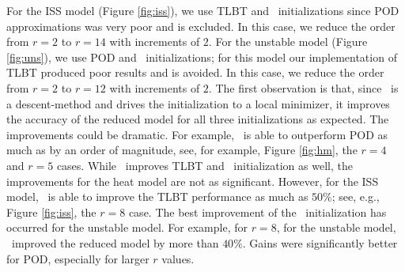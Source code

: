 \documentclass[twocolumn]{autart}
\begin{document}
  
  
   For the ISS model (Figure \ref{fig:iss}), we use  TLBT and \goyal \ initializations since  POD approximations was very poor and  is excluded. In this case, we reduce the order from $r=2$ to $r=14$ with increments of $2$. For the unstable model (Figure \ref{fig:uns}), we use POD and \goyal \ initializations; for this model our implementation of TLBT produced  poor results and is avoided. In this case,  we reduce the order from $r=2$ to $r=12$ with increments of $2$.  
 The first observation is that,  since  \FH \ is a descent-method and drives the initialization to a local minimizer,  it improves the accuracy of  the reduced model for all three initializations as expected. The improvements could be dramatic. For example, 
 \FH \ is able to outperform POD as much as by an order of magnitude, see, for example,
 Figure \ref{fig:hm}, the  $r=4$ and $r=5$ cases. 
 While \FH \ improves TLBT and \goyal\ initialization as well, the improvements for the heat model are not as significant. However, for the ISS model,
\FH \ is able to improve the TLBT performance as much as $50\%$; see, e.g., Figure \ref{fig:iss}, the $r=8$ case. 
The best improvement of the \goyal \ initialization has occurred for the unstable model. For example, for $r=8$, for the unstable model, \FH\ improved the reduced model by more than $40 \%$. Gains were significantly better for POD, especially for larger $r$ values. 
{\color{black} 
}

 
 
 
 
%
\end{document}
